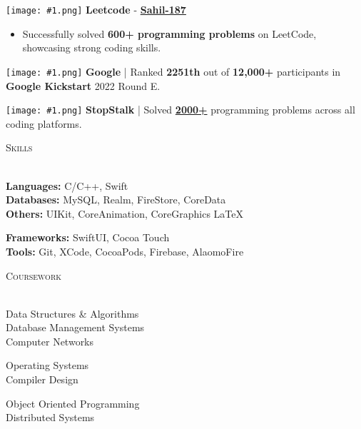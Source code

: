 \documentclass[a4paper]{article}
\newcommand{\tinyBulletSep} { \vspace{1.2mm} }
\newcommand{\bulletSep} { \vspace{2.2mm} }
\newcommand{\sectionSep} { \vspace{3mm} }
\newcommand{\lineunder} {
    \vspace*{-8pt} \\
    \hspace*{-15pt} \hrulefill \\
}
\newcommand{\header} [1] {
    {\hspace*{-18pt}\vspace*{6pt} {
        \fontfamily{qcs}\selectfont \large \scshape #1
    }}
    \vspace*{-6pt} \lineunder
    \vspace{0.5mm}
}
\newcommand{\image}[1]{
    \begingroup\normalfont
    \Large
    \texttt{[image: \#1.png]}%
    \endgroup
}
\begin{document}
\image{lc} \textbf{Leetcode} - \textbf{\href{https://leetcode.com/Sahil-187/}{Sahil-187}}
\begin{itemize}
    \item Successfully solved \textbf{600+ programming problems} on LeetCode, showcasing strong coding skills.
\end{itemize}
\tinyBulletSep

\image{google} \textbf{Google} | Ranked \textbf{2251th} out of \textbf{12,000+} participants in \textbf{Google Kickstart} 2022 Round E.
\tinyBulletSep

\image{stopstalk} \textbf{StopStalk} | Solved \textbf{\href{https://www.stopstalk.com/user/profile/Sahil_187}{2000+}} programming problems across all coding platforms.
\bulletSep
\sectionSep


\header{Skills}
\begin{minipage}[t]{0.6\textwidth}
    \textbf{Languages:} C/C++, Swift\\
    \textbf{Databases:} MySQL, Realm, FireStore, CoreData\\
    \textbf{Others:} UIKit, CoreAnimation, CoreGraphics \LaTeX
\end{minipage}
\hfill
\begin{minipage}[t]{0.33\textwidth}
    \textbf{Frameworks:} SwiftUI, Cocoa Touch\\
    \textbf{Tools:} Git, XCode, CocoaPods, Firebase, AlaomoFire
\end{minipage}
\sectionSep

\header{Coursework}
\begin{minipage}[t]{0.4\textwidth}
    Data Structures \& Algorithms\\
    Database Management Systems\\
    Computer Networks
\end{minipage}
\hfill
\begin{minipage}[t]{0.25\textwidth}
    Operating Systems\\
    Compiler Design
\end{minipage}
\hfill
\begin{minipage}[t]{0.3\textwidth}
    Object Oriented Programming\\
    Distributed Systems
\end{minipage}
\hfill
\sectionSep
\end{document}
